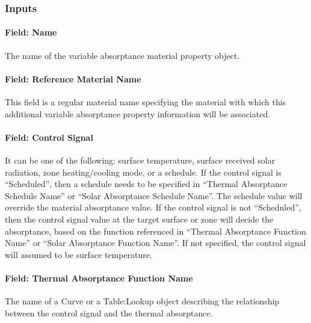 \subsubsection{Inputs}\label{inputs-materialpropertyvariableabsorptance}

\paragraph{Field: Name}\label{field-name-materialpropertyvariableabsorptance}

The name of the variable absorptance material property object.

\paragraph{Field: Reference Material Name}\label{field-reference-material-name-materialpropertyvariableabsorptance}

This field is a regular material name specifying the material with which this additional
variable absorptance property information will be associated.

\paragraph{Field: Control Signal}\label{field-control-signal}

It can be one of the following: surface temperature, surface received solar radiation, zone heating/cooling mode, or a schedule.
If the control signal is ``Scheduled'', then a schedule needs to be specified in ``Thermal Absorptance Schedule Name'' or
``Solar Absorptance Schedule Name''. The schedule value will override the material absorptance value. If the control signal
is not ``Scheduled'', then the control signal value at the target surface or zone will decide the absorptance, based on
the function referenced in ``Thermal Absorptance Function Name'' or ``Solar Absorptance Function Name''. If not specified,
the control signal will assumed to be surface temperature.

\paragraph{Field: Thermal Absorptance Function Name}\label{field-thermal-absorptance-function-name}

The name of a Curve or a Table:Lookup object describing the relationship between the control signal and the thermal absorptance.


